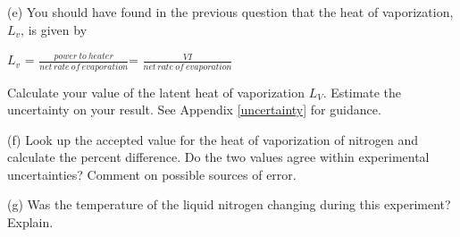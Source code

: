 (e) You should have found in the previous question that the heat 
of vaporization, \(L_{v} \), is given by

{\centering \(L_{v} \) = \( \frac{power\: to\: heater}{net\, rate\: of\: evaporation} \)=
\( \frac{VI}{net\, rate\: of\: evaporation} \)\par}
Calculate your value of the latent heat of vaporization $L_V$. 
Estimate the uncertainty on your result.
See Appendix \ref{uncertainty} for guidance.
\answerspace{30mm}

(f) Look up the accepted value for the heat of vaporization of nitrogen
and calculate the percent difference. Do the two values agree within
experimental uncertainties? Comment on possible sources of error.
\answerspace{20mm}

(g) Was the temperature of the liquid nitrogen changing during this
experiment? Explain.
